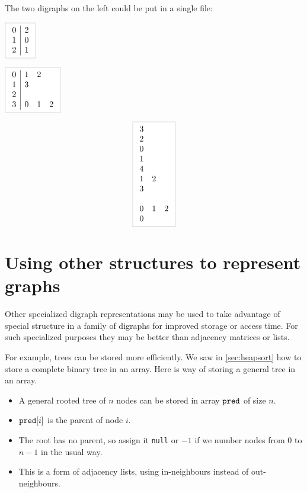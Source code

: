 \begin{Boxample} 
The two digraphs on the left could be put in a single file:\\

\begin{minipage}[c]{0.5\textwidth}
\centering
	$\lightgraybox{\begin{array}{c|c}
	0 & 2  \\
	1 & 0  \\
	2 & 1 \\
	\end{array}}$
	
	\vspace{1cm}
	$\lightgraybox{\begin{array}{c|ccc}
	0 & 1 & 2  \\
	1 & 3  \\
	2  \\
	3 & 0 & 1 & 2 \\
	\end{array}}$
\end{minipage}
\begin{minipage}[c]{0.5\textwidth}
$$
\lightgraybox{
	\begin{array}{ccc}
	3 &   &   \\
	2 &   &   \\
	0 &   &   \\
	1 &   &   \\
	4 &   &   \\
	1 & 2 &   \\
	3 &   &   \\
	  &   &   \\
	0 & 1 &  2 \\
	0 &   &   \\
	\end{array}
}
$$
\end{minipage}
\end{Boxample}


\section{Using other structures to represent graphs}
Other specialized digraph representations may be used to take advantage of
special structure in a family of digraphs for improved storage or access time. 
For such specialized purposes they may be better than adjacency matrices or lists.

For example, trees can be stored more efficiently. We saw in \cref{sec:heapsort} how to store a complete binary tree in an array. Here is way of storing a  general tree in an array.
\begin{itemize}
\item A general rooted tree of $n$ nodes can be stored in array $\operatorname{\text{\texttt{pred}}}$ of size $n$. 
\item $\operatorname{\text{\texttt{pred}}}[i]$ is the parent of node $i$. 
\item The root has no parent, so assign it \texttt{null} or $-1$ if we number nodes from $0$
to $n-1$ in the usual way. 
\item This is a form of adjacency lists, using in-neighbours instead of out-neighbours.
\end{itemize}

